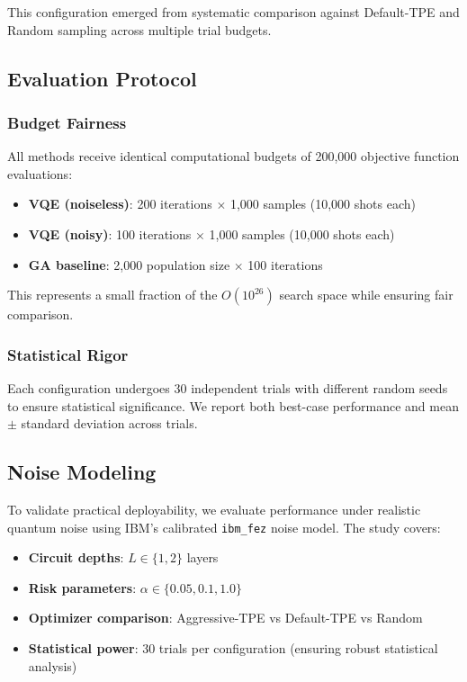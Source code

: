 This configuration emerged from systematic comparison against Default-TPE and Random sampling across multiple trial budgets.


\subsection{Evaluation Protocol}

\subsubsection{Budget Fairness}
All methods receive identical computational budgets of 200,000 objective function evaluations:
\begin{itemize}[nosep]
    \item \textbf{VQE (noiseless)}: 200 iterations $\times$ 1,000 samples (10,000 shots each)
    \item \textbf{VQE (noisy)}: 100 iterations $\times$ 1,000 samples (10,000 shots each)  
    \item \textbf{GA baseline}: 2,000 population size $\times$ 100 iterations
\end{itemize}
This represents a small fraction of the $O(10^{26})$ search space while ensuring fair comparison.

\subsubsection{Statistical Rigor}
Each configuration undergoes 30 independent trials with different random seeds to ensure statistical significance.
We report both best-case performance and mean $\pm$ standard deviation across trials.


\subsection{Noise Modeling}

To validate practical deployability, we evaluate performance under realistic quantum noise using IBM's calibrated \texttt{ibm\_fez} noise model.
The study covers:
\begin{itemize}[nosep]
    \item \textbf{Circuit depths}: $L \in \{1, 2\}$ layers
    \item \textbf{Risk parameters}: $\alpha \in \{0.05, 0.1, 1.0\}$  
    \item \textbf{Optimizer comparison}: Aggressive-TPE vs Default-TPE vs Random
    \item \textbf{Statistical power}: 30 trials per configuration (ensuring robust statistical analysis)
\end{itemize}

